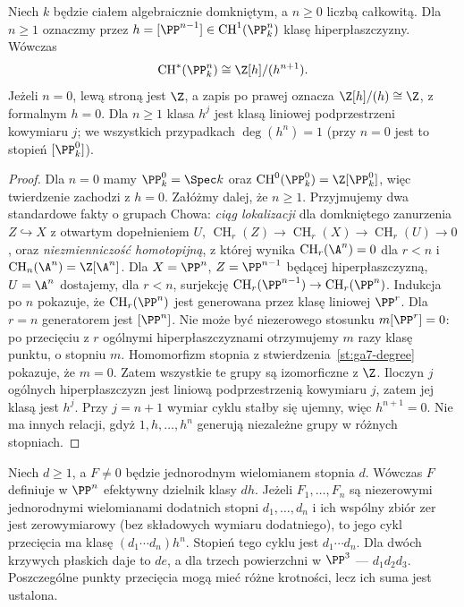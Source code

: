 \begin{twierdzenie}
\label{tw:ga7-chow-pn}
Niech $k$ będzie ciałem algebraicznie domkniętym,
a $n\ge0$ liczbą całkowitą. Dla $n\ge1$ oznaczmy
przez $h=[\PP^{n-1}]\in\operatorname{CH}^1(\PP^n_k)$
klasę hiperpłaszczyzny. Wówczas
\[
\operatorname{CH}^*(\PP^n_k)\cong\Z[h]/(h^{n+1}).
\]
Jeżeli $n=0$, lewą stroną jest $\Z$, a zapis po prawej
oznacza $\Z[h]/(h)\cong\Z$, z formalnym $h=0$.
Dla $n\ge1$ klasa $h^j$ jest klasą liniowej podprzestrzeni
kowymiaru $j$; we wszystkich przypadkach $\deg(h^n)=1$
(przy $n=0$ jest to stopień $[\PP^0_k]$).
\end{twierdzenie}
\begin{proof}
Dla $n=0$ mamy $\PP^0_k=\Spec k$ oraz
$\operatorname{CH}^0(\PP^0_k)=\Z[\PP^0_k]$,
więc twierdzenie zachodzi z $h=0$.
Załóżmy dalej, że $n\ge1$.
Przyjmujemy dwa standardowe fakty o grupach Chowa:
\emph{ciąg lokalizacji} dla domkniętego zanurzenia
$Z\hookrightarrow X$ z otwartym dopełnieniem $U$,
$\operatorname{CH}_r(Z)\to\operatorname{CH}_r(X)
\to\operatorname{CH}_r(U)\to0$, oraz
\emph{niezmienniczość homotopijną}, z której wynika
$\operatorname{CH}_r(\A^n)=0$ dla $r<n$ i
$\operatorname{CH}_n(\A^n)=\Z[\A^n]$.
Dla $X=\PP^n$, $Z=\PP^{n-1}$ będącej hiperpłaszczyzną,
$U=\A^n$ dostajemy, dla $r<n$, surjekcję
$\operatorname{CH}_r(\PP^{n-1})\to\operatorname{CH}_r(\PP^n)$.
Indukcja po $n$ pokazuje, że $\operatorname{CH}_r(\PP^n)$
jest generowana przez klasę liniowej $\PP^r$.
Dla $r=n$ generatorem jest $[\PP^n]$.
Nie może być niezerowego stosunku $m[\PP^r]=0$:
po przecięciu z $r$ ogólnymi hiperpłaszczyznami otrzymujemy
$m$ razy klasę punktu, o stopniu $m$.
Homomorfizm stopnia z
stwierdzenia~\ref{st:ga7-degree} pokazuje, że $m=0$.
Zatem wszystkie te grupy są izomorficzne z $\Z$.
Iloczyn $j$ ogólnych hiperpłaszczyzn jest liniową
podprzestrzenią kowymiaru $j$, zatem jej klasą jest $h^j$.
Przy $j=n+1$ wymiar cyklu stałby się ujemny, więc
$h^{n+1}=0$. Nie ma innych relacji, gdyż
$1,h,\ldots,h^n$ generują niezależne grupy
w różnych stopniach.
\end{proof}

\begin{przyklad}
\label{prz:ga7-bezout}
Niech $d\ge1$, a $F\ne0$ będzie jednorodnym
wielomianem stopnia $d$. Wówczas $F$ definiuje
w $\PP^n$ efektywny dzielnik klasy $dh$.
Jeżeli $F_1,\ldots,F_n$ są niezerowymi jednorodnymi
wielomianami dodatnich stopni $d_1,\ldots,d_n$
i ich wspólny zbiór zer jest zerowymiarowy (bez składowych
wymiaru dodatniego), to jego cykl przecięcia ma klasę
$(d_1\cdots d_n)h^n$. Stopień tego cyklu jest
$d_1\cdots d_n$. Dla dwóch krzywych płaskich daje to
$de$, a dla trzech powierzchni w $\PP^3$ --- $d_1d_2d_3$.
Poszczególne punkty przecięcia mogą mieć różne krotności,
lecz ich suma jest ustalona.
\end{przyklad}

